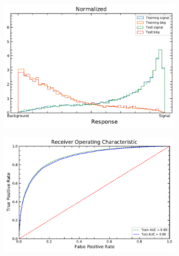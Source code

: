 
\begin{figure}[!h] 
  \begin{subfigure}[b]{0.5\linewidth}
    \centering
    \vspace*{-0.2cm}
    \includegraphics[width=0.95\linewidth]{ubonn-thesis/Chapters/Chapters_06/Figure/CR_3j2b/NormalizedResponse_PLV_3j2b_L27_20_10_06Oct2021.pdf} 
    \caption{} 
    \label{CR:3j2b:NNout} 
  \end{subfigure}%
  \vspace*{0.4cm}
  \begin{subfigure}[b]{0.5\linewidth}
    \centering
    \vspace*{-0.2cm}
    \includegraphics[width=\linewidth]{ubonn-thesis/Chapters/Chapters_06/Figure/CR_3j2b/ROC_PLV_3j2b_L27_20_10_06Oct2021.pdf} 

\end{subfigure}
\end{figure}
